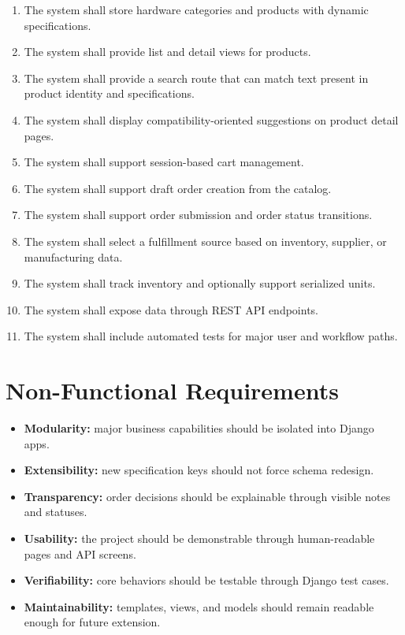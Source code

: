 \documentclass[12pt,letterpaper,oneside,openany]{book}
\begin{document}
\begin{enumerate}[leftmargin=0.4in]
    \item The system shall store hardware categories and products with dynamic specifications.
    \item The system shall provide list and detail views for products.
    \item The system shall provide a search route that can match text present in product identity and specifications.
    \item The system shall display compatibility-oriented suggestions on product detail pages.
    \item The system shall support session-based cart management.
    \item The system shall support draft order creation from the catalog.
    \item The system shall support order submission and order status transitions.
    \item The system shall select a fulfillment source based on inventory, supplier, or manufacturing data.
    \item The system shall track inventory and optionally support serialized units.
    \item The system shall expose data through REST API endpoints.
    \item The system shall include automated tests for major user and workflow paths.
\end{enumerate}

\section{Non-Functional Requirements}

\begin{itemize}[leftmargin=0.4in]
    \item \textbf{Modularity:} major business capabilities should be isolated into Django apps.
    \item \textbf{Extensibility:} new specification keys should not force schema redesign.
    \item \textbf{Transparency:} order decisions should be explainable through visible notes and statuses.
    \item \textbf{Usability:} the project should be demonstrable through human-readable pages and API screens.
    \item \textbf{Verifiability:} core behaviors should be testable through Django test cases.
    \item \textbf{Maintainability:} templates, views, and models should remain readable enough for future extension.
\end{itemize}
\end{document}
